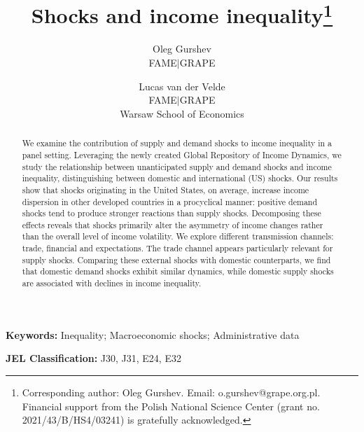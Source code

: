 \documentclass[12pt, a4paper]{article}
\title{Shocks and income inequality\thanks{Corresponding author: Oleg Gurshev. Email: o.gurshev@grape.org.pl. Financial support from the Polish National Science Center (grant no. 2021/43/B/HS4/03241) is gratefully acknowledged.}}
\author{
    Oleg Gurshev \\ 
    \small{FAME$\mid$GRAPE} 
    \and 
    Lucas van der Velde \\ 
    \small{FAME$\mid$GRAPE} \\[-0.5em] 
    \small{Warsaw School of Economics}
}
\date{}
\begin{document}
\maketitle

\thispagestyle{empty}
\begin{abstract}
\noindent 
We examine the contribution of supply and demand shocks to income inequality in a panel setting. Leveraging the newly created Global Repository of Income Dynamics, we study the relationship between unanticipated supply and demand shocks and income inequality, distinguishing between domestic and international (US) shocks. Our results show that shocks originating in the United States, on average, increase income dispersion in other developed countries in a procyclical manner: positive demand shocks tend to produce stronger reactions than supply shocks. Decomposing these effects reveals that shocks primarily alter the asymmetry of income changes rather than the overall level of income volatility. We explore different transmission channels: trade, financial and expectations. The trade channel appears particularly relevant for supply shocks. Comparing these external shocks with domestic counterparts, we find that domestic demand shocks exhibit similar dynamics, while domestic supply shocks are associated with declines in income inequality.
\end{abstract}

\bigskip
\hspace*{15pt}\textbf{Keywords:} Inequality; Macroeconomic shocks; Administrative data
 
\hspace*{15pt}\textbf{JEL Classification:} J30, J31, E24, E32
\clearpage



\end{document}
